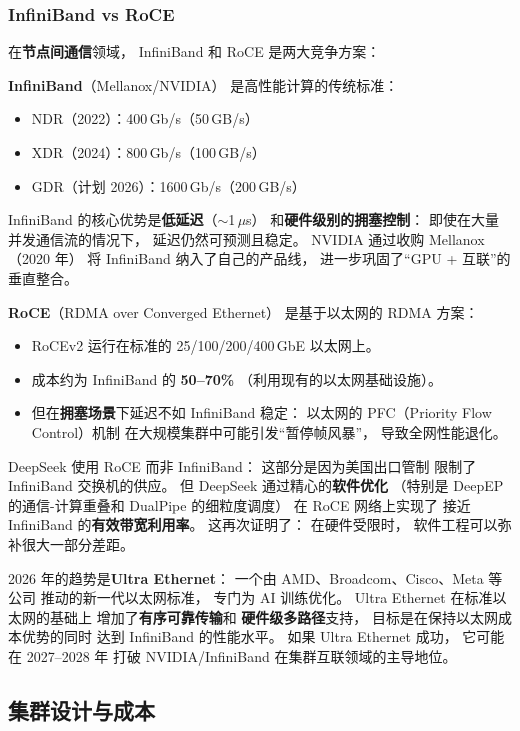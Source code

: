 \subsubsection{InfiniBand vs RoCE}

在\textbf{节点间通信}领域，
InfiniBand 和 RoCE 是两大竞争方案：

\textbf{InfiniBand}（Mellanox/NVIDIA）
是高性能计算的传统标准：
\begin{itemize}[noitemsep]
  \item NDR（2022）：400\,Gb/s（50\,GB/s）
  \item XDR（2024）：800\,Gb/s（100\,GB/s）
  \item GDR（计划 2026）：1600\,Gb/s（200\,GB/s）
\end{itemize}
InfiniBand 的核心优势是\textbf{低延迟}（$\sim$1\,$\mu$s）
和\textbf{硬件级别的拥塞控制}：
即使在大量并发通信流的情况下，
延迟仍然可预测且稳定。
NVIDIA 通过收购 Mellanox（2020 年）
将 InfiniBand 纳入了自己的产品线，
进一步巩固了“GPU + 互联”的垂直整合。

\textbf{RoCE}（RDMA over Converged Ethernet）
是基于以太网的 RDMA 方案：
\begin{itemize}[noitemsep]
  \item RoCEv2 运行在标准的 25/100/200/400\,GbE 以太网上。
  \item 成本约为 InfiniBand 的 \textbf{50--70\%}
        （利用现有的以太网基础设施）。
  \item 但在\textbf{拥塞场景}下延迟不如 InfiniBand 稳定：
        以太网的 PFC（Priority Flow Control）机制
        在大规模集群中可能引发“暂停帧风暴”，
        导致全网性能退化。
\end{itemize}

DeepSeek 使用 RoCE 而非 InfiniBand：
这部分是因为美国出口管制
限制了 InfiniBand 交换机的供应。
但 DeepSeek 通过精心的\textbf{软件优化}
（特别是 DeepEP 的通信-计算重叠和
DualPipe 的细粒度调度）
在 RoCE 网络上实现了
接近 InfiniBand 的\textbf{有效带宽利用率}。
这再次证明了：
在硬件受限时，
软件工程可以弥补很大一部分差距。

2026 年的趋势是\textbf{Ultra Ethernet}：
一个由 AMD、Broadcom、Cisco、Meta 等公司
推动的新一代以太网标准，
专门为 AI 训练优化。
Ultra Ethernet 在标准以太网的基础上
增加了\textbf{有序可靠传输}和
\textbf{硬件级多路径}支持，
目标是在保持以太网成本优势的同时
达到 InfiniBand 的性能水平。
如果 Ultra Ethernet 成功，
它可能在 2027--2028 年
打破 NVIDIA/InfiniBand 在集群互联领域的主导地位。

\subsection{集群设计与成本}

